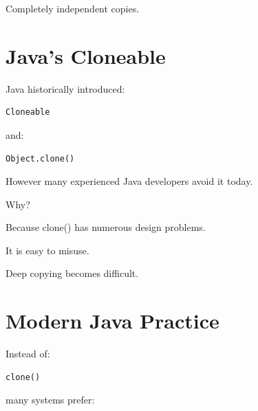 \documentclass[11pt,a4paper]{book}
\begin{document}
Completely independent copies.


\section{Java's Cloneable}

Java historically introduced:

\begin{verbatim}
Cloneable
\end{verbatim}

and:

\begin{verbatim}
Object.clone()
\end{verbatim}


However many experienced Java
developers avoid it today.


Why?


Because clone() has numerous
design problems.


It is easy to misuse.


Deep copying becomes difficult.


\section{Modern Java Practice}

Instead of:

\begin{verbatim}
clone()
\end{verbatim}

many systems prefer:

\end{document}
